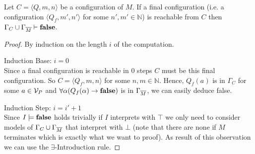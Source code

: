 \begin{claim}\label{cla.18}
	Let $C=\langle Q,m,n\rangle$ be a configuration of $M$. If a final configuration (i.e. a configuration $\langle Q_f,m',n'\rangle$ for some $n',m'\in\mathbb{N}$) is reachable from $C$ then $\Gamma_C\cup\Gamma_{\overline{M}}\vdash\textbf{false}$.
\end{claim}
\begin{proof} By induction on the length $i$ of the computation.
	
	Induction Base: $i=0$\\
	Since a final configuration is reachable in 0 steps $C$ must be this final configuration. So $C=\langle Q_f,m,n\rangle$ for some $n,m\in\mathbb{N}$. Hence, $Q_f(a)$ is in $\Gamma_C$ for some $a\in\mathcal{V}_P$ and $\forall\alpha(Q_f(\alpha)\to\textbf{false})$ is in $\Gamma_{\overline{M}}$, we can easily deduce false.
	\begin{figure}[H]
		\centering
		
	\end{figure}
	 
	Induction Step: $i= i'+1$\\
	Since $I\models\textbf{false}$ holds trivially if $I$ interprets \false{} with $\top$ we only need to consider models of $\Gamma_C\cup\Gamma_{\overline{M}}$ that interpret \false{} with $\bot$ (note that there are none if $M$ terminates which is exactly what we want to proof). As result of this observation we can use the $\exists$-Introduction rule.
	

\end{proof}
